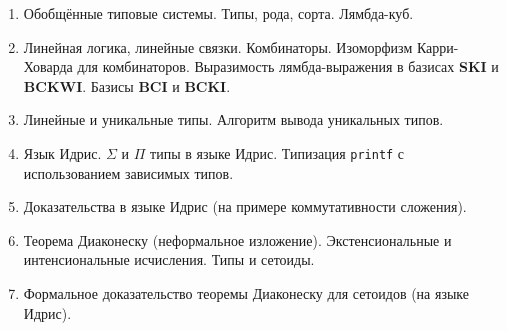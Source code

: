 \documentclass[12pt,a4paper,oneside]{book}
\begin{document}
\begin{enumerate}
\item Обобщённые типовые системы. Типы, рода, сорта. Лямбда-куб.
\item Линейная логика, линейные связки. Комбинаторы. Изоморфизм Карри-Ховарда для комбинаторов.
Выразимость лямбда-выражения в базисах \textbf{SKI} и \textbf{BCKWI}. Базисы \textbf{BCI} и \textbf{BCKI}.
\item Линейные и уникальные типы. Алгоритм вывода уникальных типов.
\item Язык Идрис. $\Sigma$ и $\Pi$ типы в языке Идрис. 
Типизация \texttt{printf} с использованием зависимых типов.
\item Доказательства в языке Идрис (на примере коммутативности сложения).
\item Теорема Диаконеску (неформальное изложение). Экстенсиональные и интенсиональные исчисления. 
Типы и сетоиды.
\item Формальное доказательство теоремы Диаконеску для сетоидов (на языке Идрис).
\end{enumerate}
\end{document}
